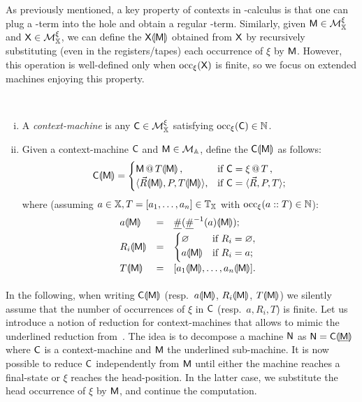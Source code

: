 \noindent
As previously mentioned, a key property of contexts in \lam-calculus is that one can plug a \lam-term into the hole and obtain a regular \lam-term.
Similarly, given $\mM\in\cMX$ and $\X\in\cMX$, we can define the \am{} $\X\hole{\mM}$ obtained from $\X$ by recursively substituting (even in the registers/tapes) each occurrence of $\xi$ by $\mM$. However, this operation is well-defined only when $\occ{\X}$ is finite, so we focus on extended machines enjoying this property.

\begin{defi}\
\begin{enumerate}[(i)]
\item A \emph{context-machine} is any $\C\in\cMX$ satisfying $\occ{\C}\in\nat$.
\item Given a context-machine $\C$ and $\mM\in\cM$, define the \am{} $\C\hole{\mM}$ as follows:
\[
	\C\hole{\mM} =\begin{cases}
	\appT{\mM}{T\hole{\mM}},&\textrm{if }\C=\appT{\xi}{T},\\
	\tuple{\vec R\hole{\mM},P,T\hole{\mM}},&\textrm{if }\C=\tuple{\vec R,P,T};\\
	\end{cases}
\]
where (assuming $a\in\XX,T = [a_1,\dots,a_n]\in\Tapes[\XX]$ with $\occ{\Cons a T}\in\nat$):
\[
	\begin{array}{lcl}
	a\hole{\mM} &=& \Lup(\Luinv{a}\hole{\mM});\\[3pt]
	R_i\hole{\mM}&=& \begin{cases}
	\Null&\textrm{if }R_i = \Null,\\
	a\hole{\mM}&\textrm{if }R_i = a;\\[3pt]
	\end{cases}~\\
	T\hole{\mM} &=& [a_1\hole{\mM},\dots,a_n\hole{\mM}].\\[3pt]
	\end{array}
\]
\end{enumerate}
\end{defi}

In the following, when writing $\C\hole{\mM}$ (resp.\ $a\hole{\mM}$, $R_i\hole{\mM}$, $T\hole{\mM}$) we silently assume that the number of occurrences of $\xi$ in $\C$ (resp.\ $a,R_i,T$) is finite.
Let us introduce a notion of reduction for context-machines that allows to mimic the underlined reduction from~\cite{BarendregtTh}. The idea is to decompose a machine $\mN$ as $\mN = \C\hole{\underline{\mM}}$ where $\C$ is a context-machine and $\mM$ the underlined sub-machine.
It is now possible to reduce $\C$ independently from $\mM$ until either the machine reaches a final-state or $\xi$ reaches the head-position. In the latter case, we substitute the head occurrence of $\xi$ by $\mM$, and continue the computation.

